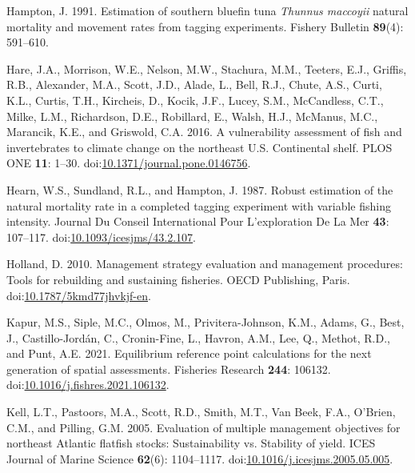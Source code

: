 \documentclass[
]{article}
\newlength{\cslhangindent}
\newlength{\cslentryspacingunit} %
\newenvironment{CSLReferences}[2] %
 {%
  \setlength{\parindent}{0pt}
  \ifodd #1
  \let\oldpar\par
  \def\par{\hangindent=\cslhangindent\oldpar}
  \fi
  \setlength{\parskip}{#2\cslentryspacingunit}
 }%
 {}
\begin{document}
\begin{CSLReferences}{1}{0}
\leavevmode{}%
Hampton, J. 1991. Estimation of southern bluefin tuna \emph{{T}hunnus maccoyii} natural mortality and movement rates from tagging experiments. Fishery Bulletin \textbf{89}(4): 591--610.

\leavevmode{}%
Hare, J.A., Morrison, W.E., Nelson, M.W., Stachura, M.M., Teeters, E.J., Griffis, R.B., Alexander, M.A., Scott, J.D., Alade, L., Bell, R.J., Chute, A.S., Curti, K.L., Curtis, T.H., Kircheis, D., Kocik, J.F., Lucey, S.M., McCandless, C.T., Milke, L.M., Richardson, D.E., Robillard, E., Walsh, H.J., McManus, M.C., Marancik, K.E., and Griswold, C.A. 2016. A vulnerability assessment of fish and invertebrates to climate change on the northeast {U}.{S}. Continental shelf. PLOS ONE \textbf{11}: 1--30. doi:\href{https://doi.org/10.1371/journal.pone.0146756}{10.1371/journal.pone.0146756}.

\leavevmode{}%
Hearn, W.S., Sundland, R.L., and Hampton, J. 1987. Robust estimation of the natural mortality rate in a completed tagging experiment with variable fishing intensity. Journal Du Conseil International Pour L'exploration De La Mer \textbf{43}: 107--117. doi:\href{https://doi.org/10.1093/icesjms/43.2.107}{10.1093/icesjms/43.2.107}.

\leavevmode{}%
Holland, D. 2010. Management strategy evaluation and management procedures: Tools for rebuilding and sustaining fisheries. OECD Publishing, Paris. doi:\href{https://doi.org/10.1787/5kmd77jhvkjf-en}{10.1787/5kmd77jhvkjf-en}.

\leavevmode{}%
Kapur, M.S., Siple, M.C., Olmos, M., Privitera-Johnson, K.M., Adams, G., Best, J., Castillo-Jordán, C., Cronin-Fine, L., Havron, A.M., Lee, Q., Methot, R.D., and Punt, A.E. 2021. Equilibrium reference point calculations for the next generation of spatial assessments. Fisheries Research \textbf{244}: 106132. doi:\href{https://doi.org/10.1016/j.fishres.2021.106132}{10.1016/j.fishres.2021.106132}.

\leavevmode{}%
Kell, L.T., Pastoors, M.A., Scott, R.D., Smith, M.T., Van Beek, F.A., O'Brien, C.M., and Pilling, G.M. 2005. Evaluation of multiple management objectives for northeast {A}tlantic flatfish stocks: Sustainability vs. Stability of yield. ICES Journal of Marine Science \textbf{62}(6): 1104--1117. doi:\href{https://doi.org/10.1016/j.icesjms.2005.05.005}{10.1016/j.icesjms.2005.05.005}.


\end{CSLReferences}
\end{document}
